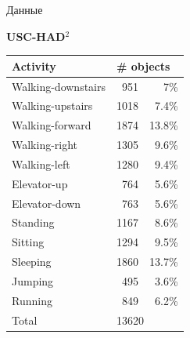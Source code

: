 \documentclass{beamer}
\begin{document}
\begin{frame}{Данные}
\begin{minipage}[t]{0.02\columnwidth}
\begin{figure}[h]
	\end{figure}
\end{minipage}
\hfill
\begin{minipage}[t]{0.47\linewidth}
	\textbf{USC-HAD}$^2$
	\begin{table}[]
		\scriptsize
		\label{my-label}
		\begin{tabular}{l|rr}
			\hline
			\textbf{Activity} & \multicolumn{2}{l}{\textbf{\# objects}} \\ \hline
			Walking-downstairs & 951 & 7\%  \\
			Walking-upstairs        & 1018&7.4\%  \\
			Walking-forward    & 1874&13.8\% \\
			Walking-right        & 1305&9.6\%  \\
			Walking-left        & 1280&9.4\%  \\
			Elevator-up        & 764&5.6\% \\
			Elevator-down        & 763&5.6\%  \\
			Standing           & 1167&8.6\%  \\
			Sitting            & 1294&9.5\%  \\
			Sleeping           & 1860&13.7\% \\
			Jumping        & 495&3.6\%  \\
			Running            & 849&6.2\%  \\ \hline 
			Total              & \multicolumn{2}{l}{13620}\\ 
			\hline
		\end{tabular}
	\end{table}
\end{minipage}
\hspace{-0.24cm}
\begin{minipage}[t]{0.02\columnwidth}
	\vspace{0.78cm}
	\begin{figure}[h]
		\centering

\end{figure}
\end{minipage}
\end{frame}
\end{document}
